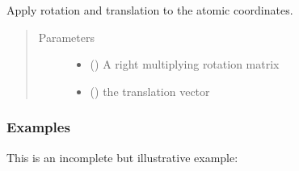 \documentclass[a4paper,10pt,english,openany,oneside]{sphinxmanual}
\begin{document}
\begin{fulllineitems}
\begin{fulllineitems}
\begin{fulllineitems}
\label{\detokenize{reference/generated/paramagpy.protein.CustomAtom.transform:paramagpy.protein.CustomAtom.transform}}
\sphinxAtStartPar
Apply rotation and translation to the atomic coordinates.
\begin{quote}\begin{description}
\item[{Parameters}] \leavevmode\begin{itemize}
\item {} 
\sphinxAtStartPar
{} () \textendash{} A right multiplying rotation matrix

\item {} 
\sphinxAtStartPar
{} () \textendash{} the translation vector

\end{itemize}

\end{description}\end{quote}
\subsubsection*{Examples}

\sphinxAtStartPar
This is an incomplete but illustrative example:

\begin{sphinxVerbatim}[commandchars=\\\{\}]
    
    
     
     
 
\end{sphinxVerbatim}


\end{fulllineitems}
\end{fulllineitems}
\end{fulllineitems}
\end{document}
